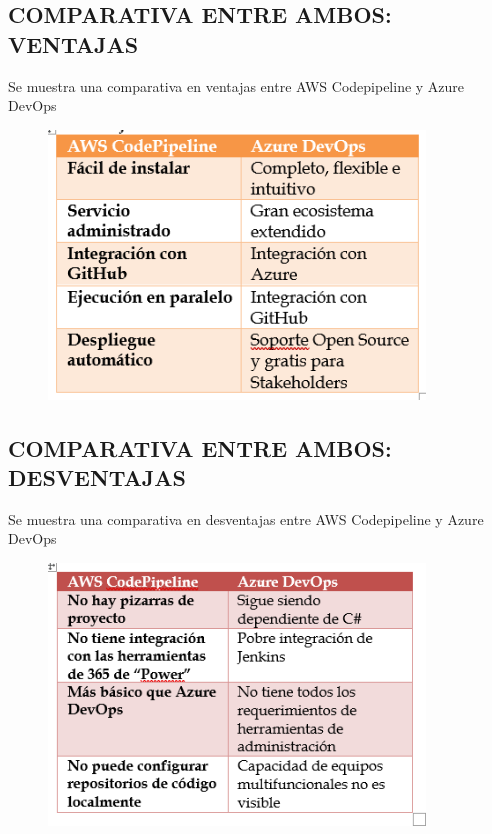 \documentclass[12pt,letterpaper]{article}
\begin{document}
\subsection{COMPARATIVA ENTRE AMBOS: VENTAJAS}

Se muestra una comparativa en ventajas entre AWS Codepipeline y Azure DevOps


\begin{figure}[h]
    \begin{center}
    \includegraphics[width=10cm]{./Imagenes/img21.png}
  
    \label{rg5}
    \end{center}
    \end{figure}






\subsection{COMPARATIVA ENTRE AMBOS: DESVENTAJAS}
Se muestra una comparativa en desventajas entre AWS Codepipeline y Azure DevOps
\begin{figure}[h]
    \begin{center}
    \includegraphics[width=10cm]{./Imagenes/img3.png}
    
    \label{rg5}
    \end{center}
    \end{figure}
\end{document}
